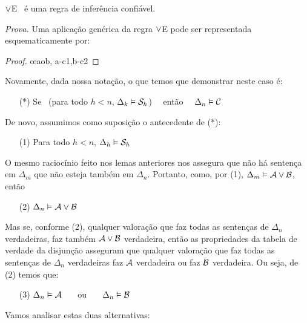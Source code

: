 \begin{factoidboxe}
	$\vee$E \ é uma regra de inferência confiável.
\end{factoidboxe}
\noindent\emph{Prova.}
Uma aplicação genérica da regra $\vee$E pode ser representada esquematicamente por:
   \begin{proof}
	   \open
	   \close
	   \open
	   \close
	   \oe{aob, a-c1,b-c2}
   \end{proof}\noindent
Novamente, dada nossa notação, o que temos que demonstrar neste caso é:   
	\begin{itemize}
		\item[(*)]  Se  \ ({para todo}  $h<n$, $\Delta_k \vDash \mathcal{S}_h$) \ \ então \ \ $\Delta_n \vDash \mathcal{C}$
	\end{itemize}   
De novo, assumimos como suposição o antecedente de (*):
	\begin{itemize}
		\item[(1)] Para todo  $h<n$, $\Delta_h \vDash \mathcal{S}_h$
	\end{itemize}
O mesmo raciocínio feito nos lemas anteriores nos assegura que não há sentença em $\Delta_m$ que não esteja também em $\Delta_n$.
Portanto, como, por (1), $\Delta_m \vDash \mathcal{A} \vee \mathcal{B}$, então
	\begin{itemize}
		\item[(2)] $\Delta_n \vDash \mathcal{A} \vee \mathcal{B}$
	\end{itemize}
Mas se, conforme (2), qualquer valoração que faz todas as sentenças de $\Delta_{n}$ verdadeiras, faz também $\mathcal{A} \vee \mathcal{B}$ verdadeira, então as propriedades da tabela de verdade da disjunção asseguram que qualquer valoração que faz todas as sentenças de  $\Delta_{n}$ verdadeiras faz $\mathcal{A}$ verdadeira ou faz $\mathcal{B}$ verdadeira. Ou seja, de (2) temos que:
	\begin{itemize}
		\item[(3)] $\Delta_n \vDash \mathcal{A}$ \ \ \ ou \ \ \ $\Delta_n \vDash \mathcal{B}$
	\end{itemize}
Vamos analisar estas duas alternativas:
